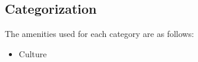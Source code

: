 

\subsection{Categorization}\label{SI:LQIcategories}
The amenities used for each category are as follows:

\begin{itemize}
  \item Culture
\end{itemize}